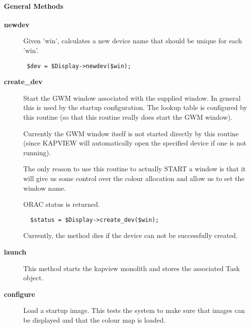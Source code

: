 \paragraph*{General Methods\label{ORAC::Display::KAPVIEW_General_Methods}}
\begin{description}

\item[\textbf{newdev}] \mbox{}

Given 'win', calculates a new device name that should be unique for
each 'win'.

\begin{verbatim}
 $dev = $Display->newdev($win);
\end{verbatim}

\item[\textbf{create\_dev}] \mbox{}

Start the GWM window associated with the supplied window.
In general this is used by the startup configuration.
The lookup table is configured by this routine (so that
this routine really does start the GWM window).



Currently the GWM window itself is not started directly
by this routine (since KAPVIEW will automatically open
the specified device if one is not running).



The only reason to use this routine to actually START a window
is that it will give us some control over the colour allocation
and allow us to set the window name.



ORAC status is returned.

\begin{verbatim}
  $status = $Display->create_dev($win);
\end{verbatim}


Currently, the method dies if the device can not be successfully
created.


\item[\textbf{launch}] \mbox{}

This method starts the kapview monolith and stores the associated
Task object.


\item[\textbf{configure}] \mbox{}

Load a startup image. This tests the system to make sure that images
can be displayed and that the colour map is loaded.




\end{description}
